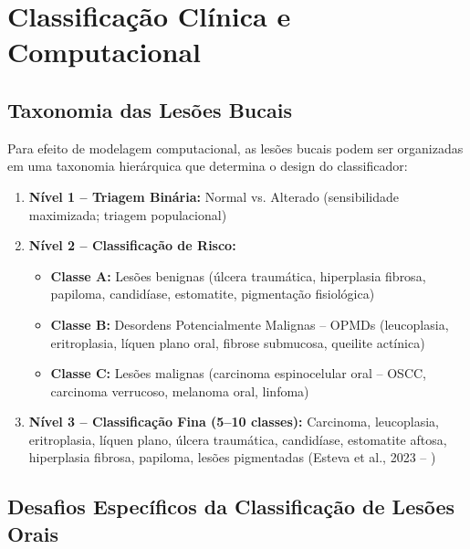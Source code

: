\section{Classificação Clínica e Computacional}
\label{sec:class-lesoes}

\subsection{Taxonomia das Lesões Bucais}

Para efeito de modelagem computacional, as lesões bucais podem ser organizadas
em uma taxonomia hierárquica que determina o design do classificador:

\begin{enumerate}
  \item \textbf{Nível 1 -- Triagem Binária:}
        Normal vs. Alterado (sensibilidade maximizada; triagem populacional)

  \item \textbf{Nível 2 -- Classificação de Risco:}
        \begin{itemize}
          \item \textbf{Classe A:} Lesões benignas (úlcera traumática, hiperplasia
                fibrosa, papiloma, candidíase, estomatite, pigmentação fisiológica)
          \item \textbf{Classe B:} Desordens Potencialmente Malignas -- OPMDs
                (leucoplasia, eritroplasia, líquen plano oral, fibrose submucosa,
                queilite actínica)
          \item \textbf{Classe C:} Lesões malignas (carcinoma espinocelular oral
                -- OSCC, carcinoma verrucoso, melanoma oral, linfoma)
        \end{itemize}

  \item \textbf{Nível 3 -- Classificação Fina (5--10 classes):}
        Carcinoma, leucoplasia, eritroplasia, líquen plano, úlcera traumática,
        candidíase, estomatite aftosa, hiperplasia fibrosa, papiloma, lesões
        pigmentadas (Esteva et al., 2023 -- )
\end{enumerate}

\subsection{Desafios Específicos da Classificação de Lesões Orais}

